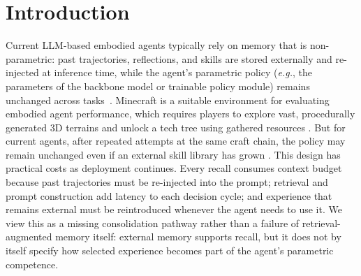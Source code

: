 \documentclass[11pt]{article}
\begin{document}


\section{Introduction}

Current LLM-based embodied agents typically rely on memory that is non-parametric: past trajectories, reflections, and skills are stored externally and re-injected at inference time, while the agent's parametric policy (\textit{e.g.}, the parameters of the backbone model or trainable policy module) remains unchanged across tasks~\cite{hu2025memory, zhang2025survey, du2026memory}. Minecraft is a suitable environment for evaluating embodied agent performance, which requires players to explore vast, procedurally generated 3D terrains and unlock a tech tree using gathered resources \cite{wang2023voyager}. But for current agents, after repeated attempts at the same craft chain, the policy may remain unchanged even if an external skill library has grown \cite{li2024optimus, wang2024jarvis}. This design has practical costs as deployment continues. Every recall consumes context budget because past trajectories must be re-injected into the prompt; retrieval and prompt construction add latency to each decision cycle; and experience that remains external must be reintroduced whenever the agent needs to use it. We view this as a missing consolidation pathway rather than a failure of retrieval-augmented memory itself: external memory supports recall, but it does not by itself specify how selected experience becomes part of the agent's parametric competence.
\end{document}
